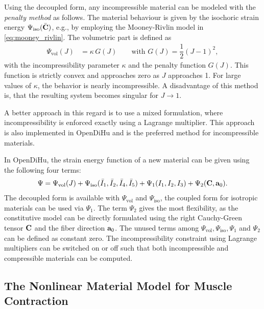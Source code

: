 Using the decoupled form, any incompressible material can be modeled with the \emph{penalty method} as follows. 
The material behaviour is given by the isochoric strain energy $\Psi_\text{iso}(\bar{\textbf{C}})$, e.g., by employing the Mooney-Rivlin model in \cref{eq:mooney_rivlin}. The volumetric part is defined as
\begin{align*}
  \Psi_\text{vol}(J) &= \kappa\,G(J) \qquad \text{with } G(J) = \dfrac12 (J-1)^2,
\end{align*}
with the incompressibility parameter $\kappa$ and the penalty function $G(J)$. This function is strictly convex and approaches zero as $J$ approaches 1. For large values of $\kappa$, the behavior is nearly incompressible. A disadvantage of this method is, that the resulting system becomes singular for $J \to 1$.

A better approach in this regard is to use a mixed formulation, where incompressibility is enforced exactly using a Lagrange multiplier. This approach is also implemented in OpenDiHu and is the preferred method for incompressible materials. 

In OpenDiHu, the strain energy function of a new material can be given using the following four terms:
%
\begin{align*}
  \Psi = \Psi_\text{vol}(J) + \Psi_\text{iso}(\bar{I}_1,\bar{I}_2,\bar{I}_4,\bar{I}_5) + \Psi_1(I_1,I_2,I_3) + \Psi_2(\textbf{C},\textbf{a}_0).
\end{align*}
The decoupled form is available with $\Psi_\text{vol}$ and $\Psi_\text{iso}$, the coupled form for isotropic materials can be used via $\Psi_1$. The term $\Psi_2$ gives the most flexibility, as the constitutive model can be directly formulated using the right Cauchy-Green tensor $\textbf{C}$ and the fiber direction $\textbf{a}_0$. The unused terms among $\Psi_\text{vol},\Psi_\text{iso},\Psi_1$ and $\Psi_2$ can be defined as constant zero. The incompressibility constraint using Lagrange multipliers can be switched on or off such that both incompressible and compressible materials can be computed.
%

\subsection{The Nonlinear Material Model for Muscle Contraction}\label{sec:material_nonlinear_model}

